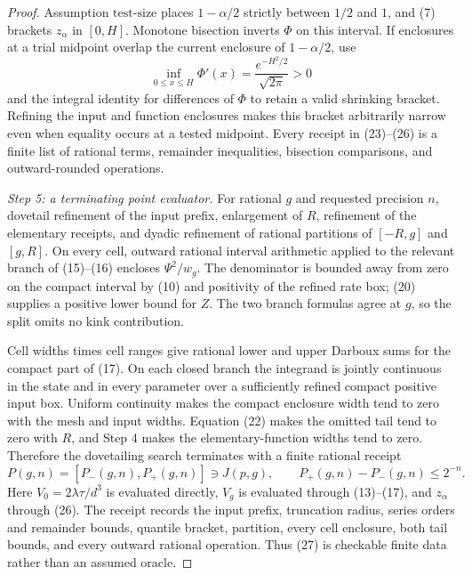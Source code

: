 \documentclass{article}
\begin{document}
\begin{proof}
Assumption \(\mathrm{test\mbox{-}size}\) places \(1-\alpha/2\) strictly between \(1/2\) and \(1\), and (7) brackets \(z_\alpha\) in \([0,H]\).  Monotone bisection inverts \(\Phi\) on this interval.  If enclosures at a trial midpoint overlap the current enclosure of \(1-\alpha/2\), use
\[
 \inf_{0\leq x\leq H}\Phi'(x)
 =\frac{e^{-H^2/2}}{\sqrt{2\pi}}>0
\tag{26}
\]
and the integral identity for differences of \(\Phi\) to retain a valid shrinking bracket.  Refining the input and function enclosures makes this bracket arbitrarily narrow even when equality occurs at a tested midpoint.  Every receipt in (23)--(26) is a finite list of rational terms, remainder inequalities, bisection comparisons, and outward-rounded operations.

\emph{Step 5: a terminating point evaluator.}
For rational \(g\) and requested precision \(n\), dovetail refinement of the input prefix, enlargement of \(R\), refinement of the elementary receipts, and dyadic refinement of rational partitions of \([-R,g]\) and \([g,R]\).  On every cell, outward rational interval arithmetic applied to the relevant branch of (15)--(16) encloses \(\Psi^2/w_g\).  The denominator is bounded away from zero on the compact interval by (10) and positivity of the refined rate box; (20) supplies a positive lower bound for \(Z\).  The two branch formulas agree at \(g\), so the split omits no kink contribution.

Cell widths times cell ranges give rational lower and upper Darboux sums for the compact part of (17).  On each closed branch the integrand is jointly continuous in the state and in every parameter over a sufficiently refined compact positive input box.  Uniform continuity makes the compact enclosure width tend to zero with the mesh and input widths.  Equation (22) makes the omitted tail tend to zero with \(R\), and Step 4 makes the elementary-function widths tend to zero.  Therefore the dovetailing search terminates with a finite rational receipt
\[
 P(g,n)=[P_-(g,n),P_+(g,n)]\ni J(p,g),
 \qquad P_+(g,n)-P_-(g,n)\leq2^{-n}.
\tag{27}
\]
Here \(V_0=2\lambda\tau/d^3\) is evaluated directly, \(V_g\) is evaluated through (13)--(17), and \(z_\alpha\) through (26).  The receipt records the input prefix, truncation radius, series orders and remainder bounds, quantile bracket, partition, every cell enclosure, both tail bounds, and every outward rational operation.  Thus (27) is checkable finite data rather than an assumed oracle.


\end{proof}
\end{document}
